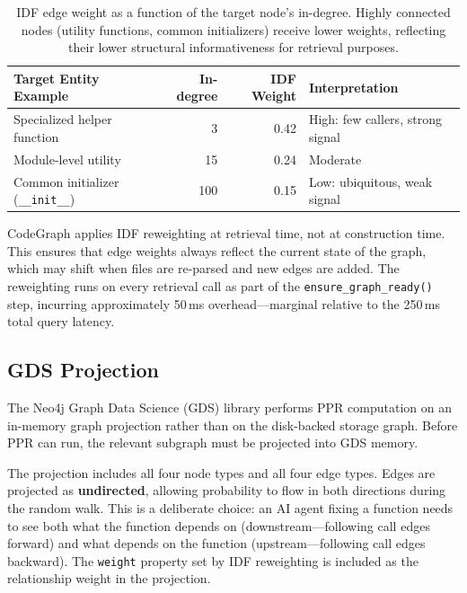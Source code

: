 \begin{table}[H]
    \centering
    \caption[IDF weight examples]{IDF edge weight as a function of the target node's in-degree. Highly connected nodes (utility functions, common initializers) receive lower weights, reflecting their lower structural informativeness for retrieval purposes.}
    \label{tab:idf-examples}
    \begin{tabular}{l r r l}
        \toprule
        \textbf{Target Entity Example}             & \textbf{In-degree} & \textbf{IDF Weight} & \textbf{Interpretation}          \\
        \midrule
        Specialized helper function                & 3                  & 0.42                & High: few callers, strong signal \\
        Module-level utility                       & 15                 & 0.24                & Moderate                         \\
        Common initializer (\texttt{\_\_init\_\_}) & 100                & 0.15                & Low: ubiquitous, weak signal     \\
        \bottomrule
    \end{tabular}
\end{table}

CodeGraph applies IDF reweighting at retrieval time, not at construction time. This ensures that edge weights always reflect the current state of the graph, which may shift when files are re-parsed and new edges are added. The reweighting runs on every retrieval call as part of the \texttt{ensure\_graph\_ready()} step, incurring approximately 50\,ms overhead---marginal relative to the 250\,ms total query latency.


\subsection{GDS Projection}
\label{sec:gds-projection}

The Neo4j Graph Data Science (GDS) library performs PPR computation on an in-memory graph projection rather than on the disk-backed storage graph. Before PPR can run, the relevant subgraph must be projected into GDS memory.

The projection includes all four node types and all four edge types. Edges are projected as \textbf{undirected}, allowing probability to flow in both directions during the random walk. This is a deliberate choice: an AI agent fixing a function needs to see both what the function depends on (downstream---following call edges forward) and what depends on the function (upstream---following call edges backward). The \texttt{weight} property set by IDF reweighting is included as the relationship weight in the projection.


